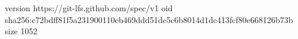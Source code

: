 version https://git-lfs.github.com/spec/v1
oid sha256:c72bdff81f5a231900110eb469ddd51de5c6b8014d1dc413fcf80e668126b73b
size 1052
